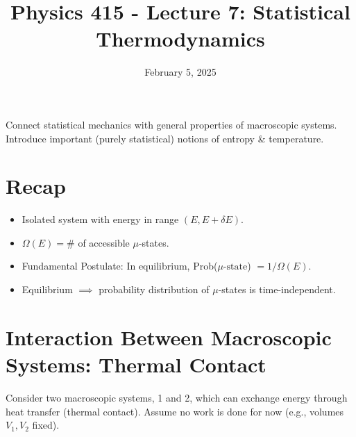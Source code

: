 \documentclass[11pt]{article}
\title{Physics 415 - Lecture 7: Statistical Thermodynamics}
\date{February 5, 2025}
\author{} %
\newcommand{\muState}{\mu\text{-state}} %
\newcommand{\OmegaE}{\Omega(E)}
\newcommand{\deltaE}{\delta E}
\begin{document}
\maketitle
\thispagestyle{empty}

Connect statistical mechanics with general properties of macroscopic systems. Introduce important (purely statistical) notions of entropy \& temperature.

\section*{Recap}
\begin{itemize}
    \item Isolated system with energy in range $(E, E+\deltaE)$.
    \item $\OmegaE = \#$ of accessible $\mu$-states.
    \item Fundamental Postulate: In equilibrium, Prob($\muState$) $= 1/\OmegaE$.
    \item Equilibrium $\implies$ probability distribution of $\mu$-states is time-independent.
\end{itemize}

\section*{Interaction Between Macroscopic Systems: Thermal Contact}

Consider two macroscopic systems, 1 and 2, which can exchange energy through heat transfer (thermal contact). Assume no work is done for now (e.g., volumes $V_1, V_2$ fixed).

\begin{center}
\end{center}
\end{document}
